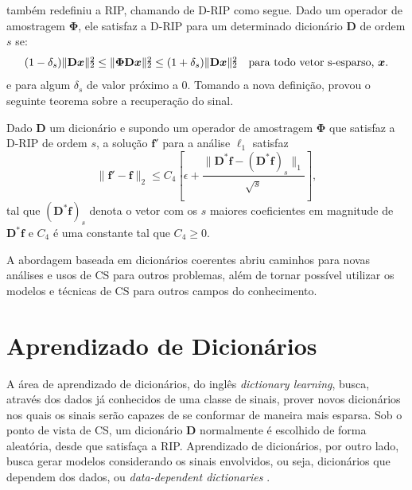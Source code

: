 \documentclass[cic,tc]{iiufrgs}
\def\SPSB#1#2{\rlap{\textsuperscript{#1}}\SB{#2}}
\def\SB#1{\textsubscript{#1}}
\renewcommand{\vec}[1]{\bm{#1}}
\newcommand{\mat}[1]{\bm{#1}}
\begin{document}
\citet{CANDESDICTS} também redefiniu a RIP, chamando de D-RIP como segue. 
Dado um operador de amostragem $\mathbf{\Phi}$, ele satisfaz a D-RIP para um determinado 
dicionário $\mathbf{D}$ de ordem $s$ se:
\begin{equation}
    (1 - \delta_s)\lVert \mathbf{D}\vec{x} \rVert\SPSB{2}{2} \le \lVert \mathbf{\Phi} \mathbf{D}\vec{x} \rVert \SPSB{2}{2} \le 
    (1 + \delta_s)\lVert \mathbf{D}\vec{x} \rVert\SPSB{2}{2} \hspace{1em} \text{para todo vetor s-esparso,  } \vec{x}.
\end{equation}
e para algum $\delta_s$ de valor próximo a 0. %
Tomando a nova definição, \citet{CANDESDICTS} provou o seguinte teorema sobre a recuperação do sinal.
\begin{teorema}
    \cite{CANDESDICTS}
    Dado $\mathbf{D}$ um dicionário e supondo um operador de amostragem $\mathbf{\Phi}$ que satisfaz
    a D-RIP de ordem $s$,
    a solução $\vec{f'}$ para a análise $\ell_1$ satisfaz
    \begin{equation*}
        \lVert \vec{f'} - \vec{f} \rVert_2 \le C_4 \left[ \epsilon + \frac{\lVert \mathbf{D}^* \vec{f} - \left( \mathbf{D}^* \vec{f} \right)_s \rVert_1}{\sqrt{s}} \right],
    \end{equation*}
    tal que $\left( \mathbf{D}^* \vec{f} \right)_s$ denota o vetor com os $s$ maiores coeficientes em 
    magnitude de $\mathbf{D}^* \vec{f}$ e $C_4$ é uma constante tal que $C_4 \ge 0$.
\end{teorema}

A abordagem baseada em dicionários coerentes abriu caminhos para novas análises e usos de CS para outros
problemas, além de tornar possível utilizar os modelos e técnicas de CS
para outros campos do conhecimento.

\section{Aprendizado de Dicionários}
\label{sec:diclearn}
A área de aprendizado de dicionários, do inglês \textit{dictionary learning}, busca, através
dos dados já conhecidos de uma classe de sinais, prover novos dicionários nos quais os sinais 
serão capazes de se conformar de maneira mais esparsa. 
Sob o ponto de vista de CS, um dicionário $\mat{D}$ normalmente é escolhido de forma aleatória,
desde que satisfaça a RIP.
Aprendizado de dicionários, por outro lado, busca gerar modelos considerando os sinais envolvidos,
ou seja, dicionários que dependem dos dados, ou \textit{data-dependent dictionaries} \cite{chen2015compressed}.
\end{document}
